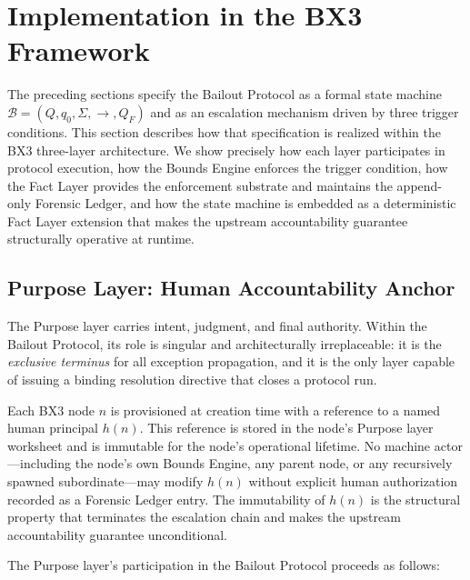 \section{Implementation in the BX3 Framework}
\label{sec:bailout-implementation}

The preceding sections specify the Bailout Protocol as a formal state machine $\mathcal{B} = (Q, q_0, \Sigma, \rightarrow, Q_F)$ and as an escalation mechanism driven by three trigger conditions. This section describes how that specification is realized within the BX3 three-layer architecture. We show precisely how each layer participates in protocol execution, how the Bounds Engine enforces the trigger condition, how the Fact Layer provides the enforcement substrate and maintains the append-only Forensic Ledger, and how the state machine is embedded as a deterministic Fact Layer extension that makes the upstream accountability guarantee structurally operative at runtime.

\subsection{Purpose Layer: Human Accountability Anchor}
\label{sec:purpose-layer}

The Purpose layer carries intent, judgment, and final authority. Within the Bailout Protocol, its role is singular and architecturally irreplaceable: it is the \emph{exclusive terminus} for all exception propagation, and it is the only layer capable of issuing a binding resolution directive that closes a protocol run.

Each BX3 node $n$ is provisioned at creation time with a reference to a named human principal $h(n)$. This reference is stored in the node's Purpose layer worksheet and is immutable for the node's operational lifetime. No machine actor---including the node's own Bounds Engine, any parent node, or any recursively spawned subordinate---may modify $h(n)$ without explicit human authorization recorded as a Forensic Ledger entry. The immutability of $h(n)$ is the structural property that terminates the escalation chain and makes the upstream accountability guarantee unconditional.

The Purpose layer's participation in the Bailout Protocol proceeds as follows:

